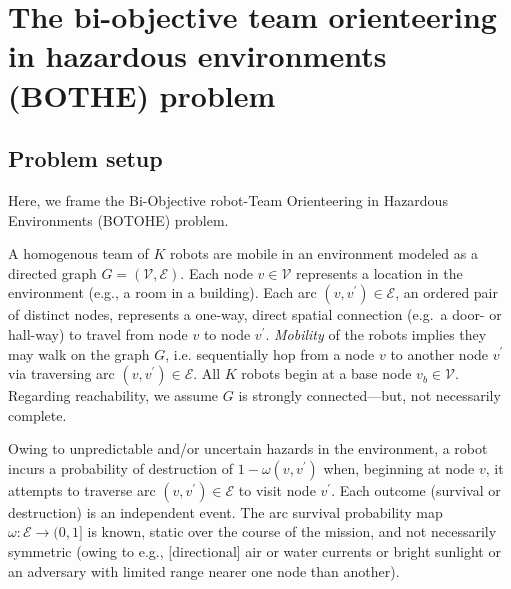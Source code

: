\documentclass[11pt, oneside]{article}
\begin{document}
\section{The bi-objective team orienteering in hazardous environments (BOTHE) problem}



\subsection{Problem setup}
Here, we frame the Bi-Objective robot-Team Orienteering in Hazardous Environments (BOTOHE) problem. 


A homogenous team of $K$ robots are mobile in an environment modeled as a directed graph $G=(\mathcal{V}, \mathcal{E})$. Each node $v \in \mathcal{V}$ represents a location in the environment (e.g., a room in a building). Each arc $(v, v^\prime) \in\mathcal{E}$, an ordered pair of distinct nodes, represents a one-way, direct spatial connection (e.g.\ a door- or hall-way) to travel from node $v$ to node $v^\prime$. 
\emph{Mobility} of the robots implies they may walk on the graph $G$, i.e. sequentially hop from a node $v$ to another node $v^\prime$ via traversing arc $(v, v^\prime)\in\mathcal{E}$.
All $K$ robots begin at a base node $v_b \in \mathcal{V}$. 
Regarding reachability, we assume $G$ is strongly connected---but, not necessarily complete. 

Owing to unpredictable and/or uncertain hazards in the environment, a robot incurs a probability of destruction of $1 - \omega(v, v^\prime)$ when, beginning at node $v$, it attempts to traverse arc $(v, v^\prime) \in \mathcal{E}$ to visit node $v^\prime$.
Each outcome (survival or destruction) is an independent event. 
The arc survival probability map $\omega: \mathcal{E} \rightarrow (0, 1]$ is known, static over the course of the mission, and not necessarily symmetric (owing to e.g., [directional] air or water currents or bright sunlight or an adversary with limited range nearer one node than another).
\end{document}
